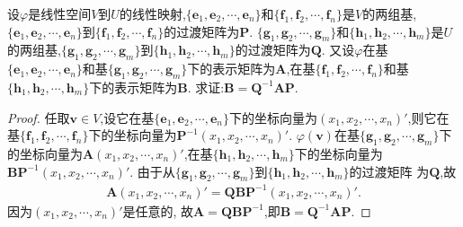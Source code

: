 \documentclass[lang=cn,newtx,10pt,scheme=chinese]{elegantbook}
\begin{document}
\begin{proposition}\label{proposition:线性映射与过渡矩阵}
    设\(\varphi\)是线性空间\(V\)到\(U\)的线性映射,\(\{\boldsymbol{e}_1,\boldsymbol{e}_2,\cdots,\boldsymbol{e}_n\}\)和\(\{\boldsymbol{f}_1,\boldsymbol{f}_2,\cdots,\boldsymbol{f}_n\}\)是\(V\)的两组基,\(\{\boldsymbol{e}_1,\boldsymbol{e}_2,\cdots,\boldsymbol{e}_n\}\)到\(\{\boldsymbol{f}_1,\boldsymbol{f}_2,\cdots,\boldsymbol{f}_n\}\)的过渡矩阵为\(\boldsymbol{P}\). \(\{\boldsymbol{g}_1,\boldsymbol{g}_2,\cdots,\boldsymbol{g}_m\}\)和\(\{\boldsymbol{h}_1,\boldsymbol{h}_2,\cdots,\boldsymbol{h}_m\}\)是\(U\)的两组基,\(\{\boldsymbol{g}_1,\boldsymbol{g}_2,\cdots,\boldsymbol{g}_m\}\)到\(\{\boldsymbol{h}_1,\boldsymbol{h}_2,\cdots,\boldsymbol{h}_m\}\)的过渡矩阵为\(\boldsymbol{Q}\). 又设\(\varphi\)在基\(\{\boldsymbol{e}_1,\boldsymbol{e}_2,\cdots,\boldsymbol{e}_n\}\)和基\(\{\boldsymbol{g}_1,\boldsymbol{g}_2,\cdots,\boldsymbol{g}_m\}\)下的表示矩阵为\(\boldsymbol{A}\),在基\(\{\boldsymbol{f}_1,\boldsymbol{f}_2,\cdots,\boldsymbol{f}_n\}\)和基\(\{\boldsymbol{h}_1,\boldsymbol{h}_2,\cdots,\boldsymbol{h}_m\}\)下的表示矩阵为\(\boldsymbol{B}\). 求证:\(\boldsymbol{B}=\boldsymbol{Q}^{-1}\boldsymbol{A}\boldsymbol{P}\).
\end{proposition}
\begin{proof}
        任取\(\boldsymbol{v}\in V\),设它在基\(\{\boldsymbol{e}_1,\boldsymbol{e}_2,\cdots,\boldsymbol{e}_n\}\)下的坐标向量为\((x_1,x_2,\cdots,x_n)'\),则它在基\(\{\boldsymbol{f}_1,\boldsymbol{f}_2,\cdots,\boldsymbol{f}_n\}\)下的坐标向量为\(\boldsymbol{P}^{-1}(x_1,x_2,\cdots,x_n)'\). \(\varphi(\boldsymbol{v})\)在基\(\{\boldsymbol{g}_1,\boldsymbol{g}_2,\cdots,\boldsymbol{g}_m\}\)下的坐标向量为\(\boldsymbol{A}(x_1,x_2,\cdots,x_n)'\),在基\(\{\boldsymbol{h}_1,\boldsymbol{h}_2,\cdots,\boldsymbol{h}_m\}\)下的坐标向量为\(\boldsymbol{B}\boldsymbol{P}^{-1}(x_1,x_2,\cdots,x_n)'\). 由于从\(\{\boldsymbol{g}_1,\boldsymbol{g}_2,\cdots,\boldsymbol{g}_m\}\)到\(\{\boldsymbol{h}_1,\boldsymbol{h}_2,\cdots,\boldsymbol{h}_m\}\)的过渡矩阵
    为\(\boldsymbol{Q}\),故
    \begin{align*}
      \boldsymbol{A}(x_1,x_2,\cdots,x_n)'=\boldsymbol{Q}\boldsymbol{B}\boldsymbol{P}^{-1}(x_1,x_2,\cdots,x_n)'.  
    \end{align*}
    因为\((x_1,x_2,\cdots,x_n)'\)是任意的,
    故\(\boldsymbol{A}=\boldsymbol{Q}\boldsymbol{B}\boldsymbol{P}^{-1}\),即\(\boldsymbol{B}=\boldsymbol{Q}^{-1}\boldsymbol{A}\boldsymbol{P}\).
\end{proof}
    
\end{document}

